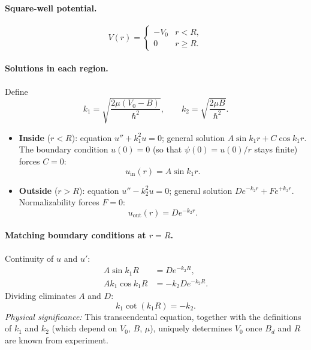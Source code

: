 \paragraph{Square-well potential.}
\begin{equation}
  \label{eq:lec04:square_well}
  V(r)=\begin{cases}-V_0&r<R,\\0&r\geq R.\end{cases}
\end{equation}

\paragraph{Solutions in each region.}
Define
\begin{equation}
  k_1=\sqrt{\frac{2\mu(V_0-B)}{\hbar^2}},\qquad
  k_2=\sqrt{\frac{2\mu B}{\hbar^2}}.
\end{equation}
\begin{itemize}
  \item \textbf{Inside} ($r<R$): equation $u''+k_1^2 u=0$; general solution
    $A\sin k_1 r+C\cos k_1 r$.  The boundary condition $u(0)=0$ (so that
    $\psi(0)=u(0)/r$ stays finite) forces $C=0$:
    \begin{equation}
      u_\mathrm{in}(r)=A\sin k_1 r.
    \end{equation}
  \item \textbf{Outside} ($r>R$): equation $u''-k_2^2 u=0$; general solution
    $De^{-k_2 r}+Fe^{+k_2 r}$.  Normalizability forces $F=0$:
    \begin{equation}
      u_\mathrm{out}(r)=De^{-k_2 r}.
    \end{equation}
\end{itemize}

\paragraph{Matching boundary conditions at $r=R$.}
Continuity of $u$ and $u'$:
\begin{align}
  A\sin k_1 R &= De^{-k_2 R},\\
  Ak_1\cos k_1 R &= -k_2 De^{-k_2 R}.
\end{align}
Dividing eliminates $A$ and $D$:
\begin{equation}
  \label{eq:lec04:bc}
  \boxed{k_1\cot(k_1 R)=-k_2.}
\end{equation}
\textit{Physical significance:} This transcendental equation, together with the
definitions of $k_1$ and $k_2$ (which depend on $V_0$, $B$, $\mu$), uniquely
determines $V_0$ once $B_d$ and $R$ are known from experiment.

